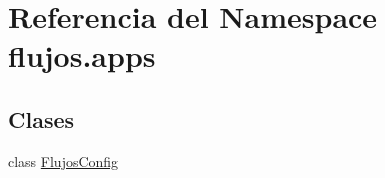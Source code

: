 \hypertarget{namespaceflujos_1_1apps}{}\section{Referencia del Namespace flujos.\+apps}
\label{namespaceflujos_1_1apps}
\subsection*{Clases}
\begin{DoxyCompactItemize}
\item 
class \hyperlink{classflujos_1_1apps_1_1_flujos_config}{Flujos\+Config}
\end{DoxyCompactItemize}
